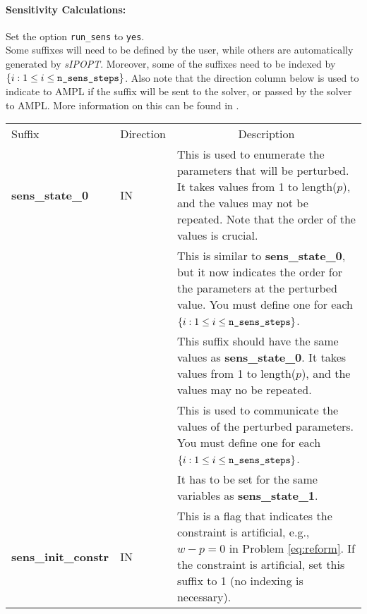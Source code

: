 \documentclass[letter, 11pt]{article}
\newcommand{\sensKKT}{\emph{sIPOPT}}
\newcommand{\AMPL}{AMPL}
\newcommand{\curls}[1]{\ensuremath{\left\{ #1 \right\}}}
\newcommand{\runaskkt}{run\_sens}
\newcommand{\statez}{sens\_state\_0}
\newcommand{\stateo}{sens\_state\_1}
\newcommand{\statei}[1]{sens\_state\_#1}
\newcommand{\statevi}[1]{sens\_state\_value\_#1}
\newcommand{\initc}{sens\_init\_constr}
\newcommand{\nstepsopt}{n\_sens\_steps}
\begin{document}
\paragraph{Sensitivity Calculations:} Set the option \texttt{{\runaskkt}} to \texttt{yes}.\\

Some suffixes will need to be defined by the user, while others are automatically generated by {\sensKKT}. Moreover,
some of the suffixes need to be indexed by  $\curls{i: 1 \leq i \leq \mbox{\texttt{\nstepsopt}}}$. Also note that the
direction column below is used to indicate to {\AMPL} if the suffix will be sent to the solver, or passed by the solver to {\AMPL}.
More information on this can be found in \cite{ampl}.\\

\begin{tabular}{|>{\centering}m{3.5cm}|>{\centering}m{2cm}|m{}|}\hline
\multicolumn{3}{|c|}{\textbf{Defined by User}} \\ \hline
Suffix & Direction & \multicolumn{1}{c|}{Description}  \\ \hline
\textbf{\statez} & IN & This is used to enumerate the parameters that will be perturbed. It takes values from 1 to length($p$), and
                      the values may not be repeated. Note that the order of the values is crucial.\\ \hline
\multirow{2}{*}{\textbf{\statei{\emph{i}}}} & \multirow{2}{*}{IN } &
                         This is similar to \textbf{\statez}, but it now indicates the order for the parameters at the perturbed value.
						 You must define one for each $\curls{i: 1 \leq i \leq \mbox{\texttt{\nstepsopt}}}$. \\
                      && This suffix should have the same values as \textbf{\statez}. It takes values from 1 to length($p$), and
                         the values may no be repeated.\\ \hline
\multirow{2}{*}{\textbf{\statevi{\emph{i}}}} & \multirow{2}{*}{IN} &
                           This is used to communicate the values of the perturbed parameters.
					       You must define one for each  $\curls{i: 1 \leq i \leq \mbox{\texttt{\nstepsopt}}}$. \\
                      &&   It has to be set for the same variables as \textbf{\stateo}.\\ \hline
\textbf{\initc} & IN & This is a flag that indicates the constraint is artificial, e.g., $w - p=0$ in Problem \eqref{eq:reform}.
              If the constraint is artificial, set this suffix to 1 (no indexing is necessary). \\ \hline

\end{tabular}
\end{document}
